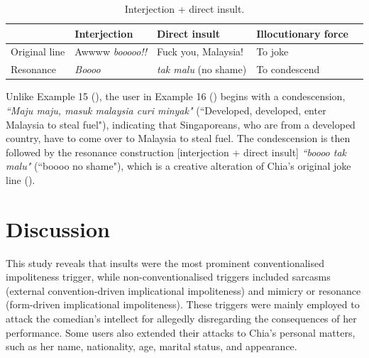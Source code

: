 \documentclass[english]{textolivre}
\begin{document}
\begin{table}[h!]
\centering
\begin{threeparttable}
\caption{Interjection + direct insult.}\label{tab-9}
\begin{tabular}{lllll}
\toprule
& Interjection & Direct insult & Illocutionary force \\
\midrule
Original line & Awwww \emph{booooo!!} & Fuck you, Malaysia! & To joke \\
Resonance & \emph{Boooo} & \textit{tak malu} (no shame) & To condescend \\
\bottomrule
\end{tabular}
\end{threeparttable}
\end{table}

Unlike Example 15 (), the user in Example 16 () begins with a condescension, \textit{``Maju maju, masuk malaysia curi minyak"} (``Developed, developed, enter Malaysia to steal fuel"), indicating that Singaporeans, who are from a developed country, have to come over to Malaysia to steal fuel. The condescension is then followed by the resonance construction [interjection + direct insult] \textit{``boooo tak malu"} (``boooo no shame"), which is a creative alteration of Chia’s original joke line ().

\section{Discussion}
This study reveals that insults were the most prominent conventionalised impoliteness trigger, while non-conventionalised triggers included sarcasms (external convention-driven implicational impoliteness) and mimicry or resonance (form-driven implicational impoliteness). These triggers were mainly employed to attack the comedian’s intellect for allegedly disregarding the consequences of her performance. Some users also extended their attacks to Chia’s personal matters, such as her name, nationality, age, marital status, and appearance.
\end{document}
